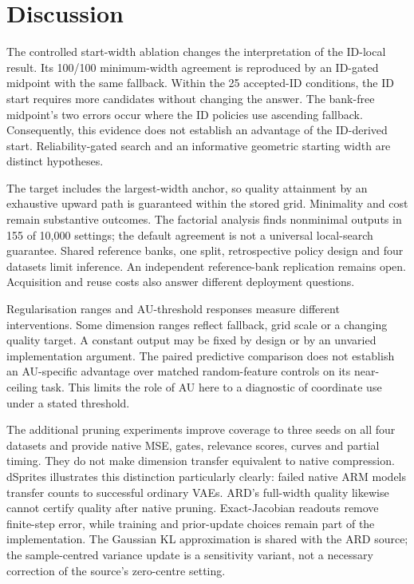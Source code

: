 \documentclass[make,article,submit,pdftex,moreauthors]{Definitions/mdpi}
\begin{document}
\section{Discussion}\label{sec:discussion}
The controlled start-width ablation changes the interpretation of the
ID-local result. Its 100/100 minimum-width agreement is reproduced by
an ID-gated midpoint with the same fallback. Within the 25 accepted-ID
conditions, the ID start requires more candidates without changing the
answer. The bank-free midpoint's two errors occur where the ID policies
use ascending fallback. Consequently, this evidence does not establish
an advantage of the ID-derived start. Reliability-gated search and an
informative geometric starting width are distinct hypotheses.

The target includes the largest-width anchor, so quality attainment by
an exhaustive upward path is guaranteed within the stored grid.
Minimality and cost remain substantive outcomes. The factorial analysis
finds nonminimal outputs in 155 of 10,000 settings; the default agreement
is not a universal local-search guarantee. Shared reference banks, one
split, retrospective policy design and four datasets limit inference.
An independent reference-bank replication remains open. Acquisition
and reuse costs also answer different deployment questions.

Regularisation ranges and AU-threshold responses measure different
interventions. Some dimension ranges reflect fallback, grid scale or a
changing quality target. A constant output may be fixed by design or by
an unvaried implementation argument. The paired predictive comparison
does not establish an AU-specific advantage over matched random-feature
controls on its near-ceiling task. This limits the role of AU here to
a diagnostic of coordinate use under a stated threshold.

The additional pruning experiments improve coverage to three seeds on
all four datasets and provide native MSE, gates, relevance scores,
curves and partial timing. They do not make dimension transfer equivalent
to native compression. dSprites illustrates this distinction particularly
clearly: failed native ARM models transfer counts to successful ordinary
VAEs. ARD's full-width quality likewise cannot certify quality after
native pruning. Exact-Jacobian readouts remove finite-step error, while
training and prior-update choices remain part of the implementation.
The Gaussian KL approximation is shared with the ARD source; the
sample-centred variance update is a sensitivity variant, not a necessary
correction of the source's zero-centre setting.
\end{document}
